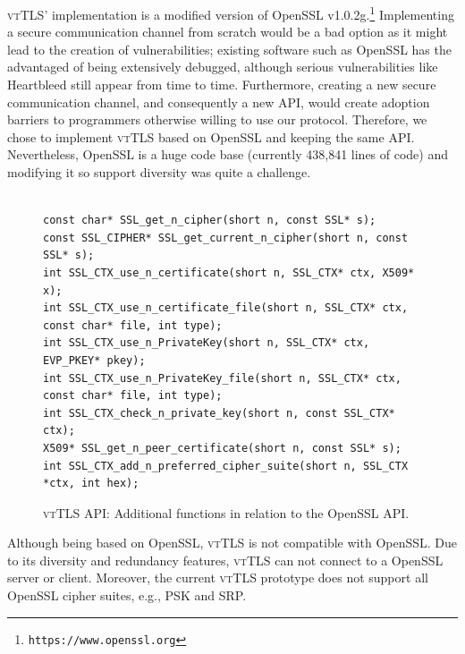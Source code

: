 \documentclass{sig-alternate-05-2015}
\begin{document}
\textsc{vtTLS}' implementation is a modified version of OpenSSL v1.0.2g.\footnote{\texttt{https://www.openssl.org}} Implementing a secure communication channel from scratch would be a bad option as it might lead to the creation of vulnerabilities; existing software such as OpenSSL has the advantaged of being extensively debugged, although serious vulnerabilities like Heartbleed still appear from time to time.
Furthermore, creating a new secure communication channel, and consequently a new API, would create adoption barriers to programmers otherwise willing to use our protocol. Therefore, we chose to implement \textsc{vtTLS} based on OpenSSL and keeping the same API. Nevertheless, OpenSSL is a huge code base (currently 438,841 lines of code) and modifying it so support diversity was quite a challenge.

\begin{figure}[tb]
\center\footnotesize
\begin{verbatim}

const char* SSL_get_n_cipher(short n, const SSL* s);
const SSL_CIPHER* SSL_get_current_n_cipher(short n, const SSL* s);
int SSL_CTX_use_n_certificate(short n, SSL_CTX* ctx, X509* x);
int SSL_CTX_use_n_certificate_file(short n, SSL_CTX* ctx, const char* file, int type);
int SSL_CTX_use_n_PrivateKey(short n, SSL_CTX* ctx, EVP_PKEY* pkey);
int SSL_CTX_use_n_PrivateKey_file(short n, SSL_CTX* ctx, const char* file, int type);
int SSL_CTX_check_n_private_key(short n, const SSL_CTX* ctx);
X509* SSL_get_n_peer_certificate(short n, const SSL* s);
int SSL_CTX_add_n_preferred_cipher_suite(short n, SSL_CTX *ctx, int hex);

\end{verbatim}
\caption{\textsc{vtTLS} API: Additional functions in relation to the OpenSSL API.}
\label{fig:vtTLS-api}
\end{figure}

Although being based on OpenSSL, \textsc{vtTLS} is not compatible with OpenSSL. Due to its diversity and redundancy features, \textsc{vtTLS} can not connect to a OpenSSL server or client. %
%
Moreover, the current \textsc{vtTLS} prototype does not support all OpenSSL cipher suites, e.g., PSK and SRP.
\end{document}
